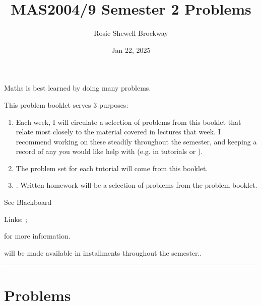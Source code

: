 \documentclass[letterpaper,10pt,english]{jupyterBook}
\title{MAS2004/9 Semester 2 Problems}
\date{Jan 22, 2025}
\author{Rosie Shewell Brockway}
\begin{document}
\pagestyle{empty}
\sphinxmaketitle
\pagestyle{plain}
\sphinxtableofcontents
\pagestyle{normal}
\label{\detokenize{intro::doc}}


\sphinxAtStartPar
Maths is best learned by doing many problems.

\sphinxAtStartPar
This problem booklet serves 3 purposes:
\begin{enumerate}
%
\item {} 
\sphinxAtStartPar
{} Each week, I will circulate a selection of problems from this booklet that relate most closely to the material covered in lectures that week. I recommend working on these steadily throughout the semester, and keeping a record of any you would like help with (e.g. in tutorials or ).

\item {} 
\sphinxAtStartPar
{} The problem set for each tutorial will come from this booklet.

\item {} 
\sphinxAtStartPar
{}. Written homework will be a selection of problems from the problem booklet.

\end{enumerate}

\sphinxAtStartPar
See Blackboard%
\begin{footnote}[1]\sphinxAtStartFootnote
Links: ; 
%
\end{footnote} for more information.

\sphinxAtStartPar
{\hyperref[\detokenize{Solutions-full:sol}]{}} will be made available in installments throughout the semester..


\bigskip\hrule\bigskip


\sphinxstepscope


\section{Problems}
\label{\detokenize{Problems:problems}}\label{\detokenize{Problems:prob}}\label{\detokenize{Problems::doc}}
\end{document}
